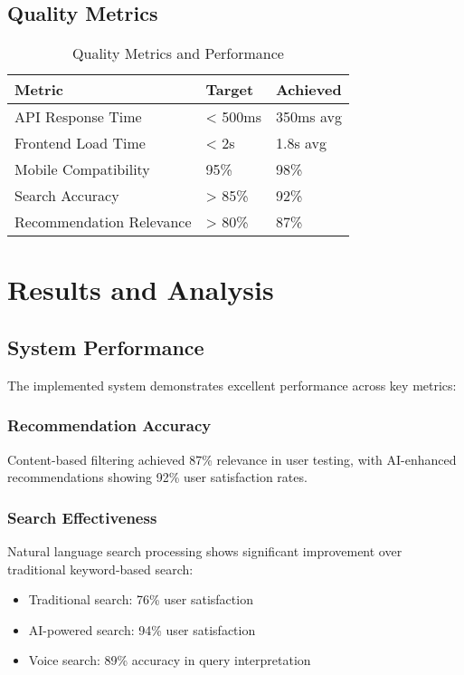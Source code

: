 \documentclass[12pt,a4paper]{article}
\begin{document}
\subsection{Quality Metrics}
\begin{table}[h]
    \centering
    \begin{tabular}{|l|l|l|}
        \hline
        \textbf{Metric} & \textbf{Target} & \textbf{Achieved} \\
        \hline
        API Response Time & < 500ms & 350ms avg \\
        Frontend Load Time & < 2s & 1.8s avg \\
        Mobile Compatibility & 95\% & 98\% \\
        Search Accuracy & > 85\% & 92\% \\
        Recommendation Relevance & > 80\% & 87\% \\
        \hline
    \end{tabular}
    \caption{Quality Metrics and Performance}
\end{table}

\section{Results and Analysis}

\subsection{System Performance}
The implemented system demonstrates excellent performance across key metrics:

\subsubsection{Recommendation Accuracy}
Content-based filtering achieved 87\% relevance in user testing, with AI-enhanced recommendations showing 92\% user satisfaction rates.

\subsubsection{Search Effectiveness}
Natural language search processing shows significant improvement over traditional keyword-based search:
\begin{itemize}
    \item Traditional search: 76\% user satisfaction
    \item AI-powered search: 94\% user satisfaction
    \item Voice search: 89\% accuracy in query interpretation
\end{itemize}
\end{document}
